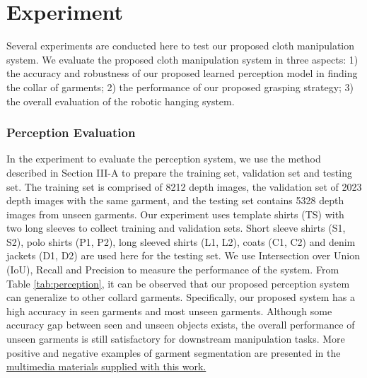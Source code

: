 \documentclass[letterpaper, 10 pt, conference]{ieeeconf}  %
\begin{document}
\section{Experiment}
Several experiments are conducted here to test our proposed cloth manipulation system. We evaluate the proposed cloth manipulation system in three aspects: 1) the accuracy and robustness of our proposed learned perception model in finding the collar of garments; 2) the performance of our proposed grasping strategy; 3) the overall evaluation of the robotic hanging system.
\subsubsection{Perception Evaluation}
In the experiment to evaluate the perception system, we use the method described in Section III-A to prepare the training set, validation set and testing set. The training set is comprised of 8212 depth images, the validation set of 2023 depth images with the same garment, and the testing set contains 5328 depth images from unseen garments. Our experiment uses template shirts (TS) with two long sleeves to collect training and validation sets. Short sleeve shirts (S1, S2), polo shirts (P1, P2), long sleeved shirts (L1, L2), coats (C1, C2) and denim jackets (D1, D2) are used here for the testing set. We use Intersection over Union (IoU), Recall and Precision to measure the performance of the system.
From Table \ref{tab:perception}, it can be observed that our proposed perception system can generalize to other collard garments. Specifically, our proposed system has a high accuracy in seen garments and most unseen garments. Although some accuracy gap between seen and unseen objects exists, the overall performance of unseen garments is still satisfactory for downstream manipulation tasks.
More positive and negative examples of garment segmentation are presented in the \href{https://sites.google.com/view/garment-hanging}{multimedia materials supplied with this work.}
\end{document}
